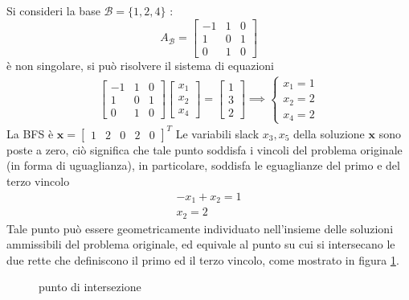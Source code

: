 \documentclass[10pt, letterpaper]{report}
\newcommand{\x}{{\mathbf{x}}}
\begin{document}
Si consideri la base $\mathcal B = \{1,2,4\}$ : 
$$A_{\mathcal B}=\begin{bmatrix}
    -1&1&0\\ 1&0&1\\0&1&0
\end{bmatrix} 
$$
è non singolare, si può risolvere il sistema di equazioni 
\begin{eqnarray}\begin{bmatrix}
    -1&1&0\\ 1&0&1\\0&1&0
\end{bmatrix} \begin{bmatrix}
    x_1\\x_2\\x_4
\end{bmatrix}=\begin{bmatrix}
    1\\ 3\\ 2
\end{bmatrix}\implies  \begin{cases}
    x_1=1\\x_2=2\\x_4=2
\end{cases}
\end{eqnarray}
La BFS è $\mathbf x = \begin{bmatrix}
    1&2&0&2&0
\end{bmatrix}^T$
Le variabili slack $x_3,x_5$ della soluzione $\mathbf x$ sono poste a zero, ciò significa che tale punto soddisfa i vincoli del problema originale (in forma di uguaglianza), in particolare, soddisfa le eguaglianze del primo e del terzo vincolo $$ \begin{matrix}
    -x_1+x_2= 1 \\ x_2 = 2
\end{matrix}$$ 
Tale punto può essere geometricamente individuato nell'insieme delle soluzioni ammissibili del problema originale, ed equivale al punto su cui si intersecano le due rette che definiscono il primo ed il terzo vincolo, come mostrato in figura \ref{fig:solEsempio2}.
\begin{figure}[h]\label{fig:solEsempio2}
    \caption{punto di intersezione}
\end{figure}
\end{document}
